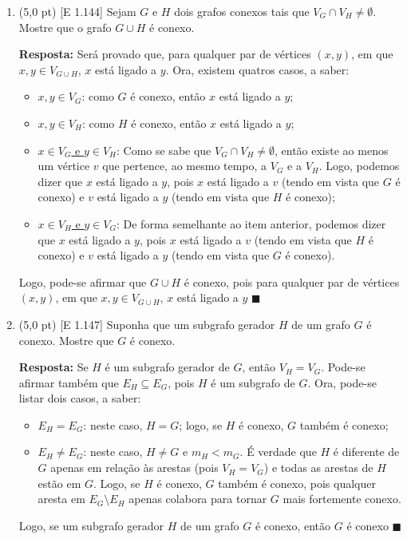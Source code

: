 \documentclass[12pt,a4paper,oneside]{article}
\begin{document}
\begin{enumerate}

	\item (5,0 pt) [E 1.144] Sejam $G$ e $H$ dois grafos conexos tais que $V_G \cap V_H \not= \emptyset$. Mostre que o grafo $G \cup H$ é conexo.
	
	\vspace{0.5cm}
	
	{\color{blue} {\bf Resposta:} Será provado que, para qualquer par de vértices $(x, y)$, em que $x,y \in V_{G \cup H}$, $x$ está ligado a $y$. Ora, existem quatros casos, a saber:
		\begin{itemize}
			\item \underline{$x,y \in V_{G}$}: como $G$ é conexo, então $x$ está ligado a $y$;
			\item \underline{$x,y \in V_{H}$}: como $H$ é conexo, então $x$ está ligado a $y$;
			\item \underline{$x \in V_{G}$ e $y \in V_H$}: Como se sabe que $V_G \cap V_H \not= \emptyset$, então existe ao menos um vértice $v$ que pertence, ao mesmo tempo, a $V_G$ e a $V_H$. Logo, podemos dizer que $x$ está ligado a $y$, pois $x$ está ligado a $v$ (tendo em vista que $G$ é conexo) e $v$ está ligado a $y$ (tendo em vista que $H$ é conexo);
			\item \underline{$x \in V_{H}$ e $y \in V_G$}: De forma semelhante ao item anterior, podemos dizer que $x$ está ligado a $y$, pois $x$ está ligado a $v$ (tendo em vista que $H$ é conexo) e $v$ está ligado a $y$ (tendo em vista que $G$ é conexo).
		\end{itemize}
		Logo, pode-se afirmar que $G \cup H$ é conexo, pois para qualquer par de vértices $(x, y)$, em que $x,y \in V_{G \cup H}$, $x$ está ligado a $y$  $\blacksquare$
	}
	
	\item (5,0 pt) [E 1.147] Suponha que um subgrafo gerador $H$ de um grafo $G$ é conexo. Mostre que $G$ é conexo.
	
	\vspace{0.5cm}
	
	{\color{blue} {\bf Resposta:} Se $H$ é um subgrafo gerador de $G$, então $V_H = V_G$. Pode-se afirmar também que $E_H \subseteq E_G$, pois $H$ é um subgrafo de $G$. Ora, pode-se listar dois casos, a saber:
		\begin{itemize}
			\item \underline{$E_H = E_G$}: neste caso, $H = G$; logo, se $H$ é conexo, $G$ também é conexo;
			\item \underline{$E_H \not= E_G$}: neste caso, $H \not= G$ e $m_H < m_G$. É verdade que $H$ é diferente de $G$ apenas em relação às arestas (pois $V_H = V_G$)  e todas as arestas de $H$ estão em $G$. Logo, se $H$ é conexo, $G$ também é conexo, pois qualquer aresta em $E_G \setminus E_H$ apenas colabora para tornar $G$ mais fortemente conexo.
		\end{itemize}
		Logo, se um subgrafo gerador $H$ de um grafo $G$ é conexo, então $G$ é conexo $\blacksquare$
	}
	\end{enumerate}
\end{document}
